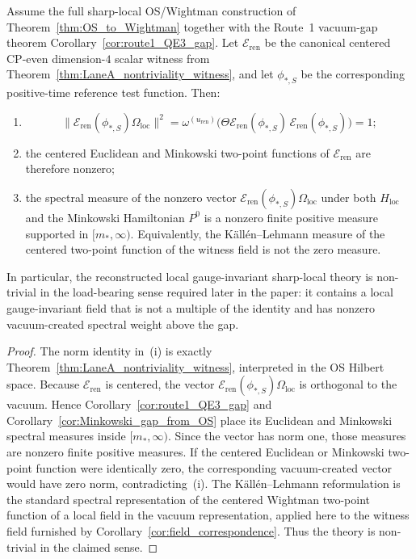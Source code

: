 \begin{theorem}\label{thm:nontriviality_package}
Assume the full sharp-local OS/Wightman construction of Theorem~\ref{thm:OS_to_Wightman} together with the Route~1 vacuum-gap theorem
Corollary~\ref{cor:route1_QE3_gap}.
Let $\mathcal E_{\mathrm{ren}}$ be the canonical centered CP-even dimension-$4$ scalar witness from Theorem~\ref{thm:LaneA_nontriviality_witness},
and let $\phi_{\ast,S}$ be the corresponding positive-time reference test function.
Then:
\begin{enumerate}[label=(\roman*),leftmargin=2.3em]
\item
\[
\|\mathcal E_{\mathrm{ren}}(\phi_{\ast,S})\Omega_{\mathrm{loc}}\|^2
=\omega^{(u_{\mathrm{ren}})}\big(\Theta\mathcal E_{\mathrm{ren}}(\phi_{\ast,S})\,\mathcal E_{\mathrm{ren}}(\phi_{\ast,S})\big)=1;
\]
\item the centered Euclidean and Minkowski two-point functions of $\mathcal E_{\mathrm{ren}}$ are therefore nonzero;
\item the spectral measure of the nonzero vector $\mathcal E_{\mathrm{ren}}(\phi_{\ast,S})\Omega_{\mathrm{loc}}$ under both $H_{\mathrm{loc}}$ and the Minkowski Hamiltonian $P^0$ is a nonzero finite positive measure supported in $[m_\ast,\infty)$.
Equivalently, the K\"all\'en--Lehmann measure of the centered two-point function of the witness field is not the zero measure.
\end{enumerate}
In particular, the reconstructed local gauge-invariant sharp-local theory is non-trivial in the load-bearing sense required later in the paper: it contains a local gauge-invariant field that is not a multiple of the identity and has nonzero vacuum-created spectral weight above the gap.
\end{theorem}

\begin{proof}
The norm identity in~(i) is exactly Theorem~\ref{thm:LaneA_nontriviality_witness}, interpreted in the OS Hilbert space.
Because $\mathcal E_{\mathrm{ren}}$ is centered, the vector $\mathcal E_{\mathrm{ren}}(\phi_{\ast,S})\Omega_{\mathrm{loc}}$ is orthogonal to the vacuum.
Hence Corollary~\ref{cor:route1_QE3_gap} and Corollary~\ref{cor:Minkowski_gap_from_OS} place its Euclidean and Minkowski spectral measures inside $[m_\ast,\infty)$.
Since the vector has norm one, those measures are nonzero finite positive measures.
If the centered Euclidean or Minkowski two-point function were identically zero, the corresponding vacuum-created vector would have zero norm, contradicting~(i).
The K\"all\'en--Lehmann reformulation is the standard spectral representation of the centered Wightman two-point function of a local field in the vacuum representation, applied here to the witness field furnished by Corollary~\ref{cor:field_correspondence}.
Thus the theory is non-trivial in the claimed sense.
\end{proof}
